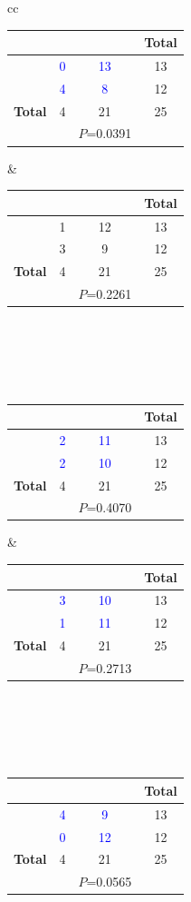 \documentclass[compress, notes=hide]{beamer}
\begin{document}
\begin{frame}
\begin{block}{}
\begin{table}
\begin{footnotesize}
\begin{tabular}{cc}
\begin{tabular}{lccc}
& & & \textbf{Total}
\\
\hline
& \textcolor{blue}{0} &  \textcolor{blue}{13} & 13 \\
&  \textcolor{blue}{4} &  \textcolor{blue}{8} & 12 \\
\textbf{Total} & 4 & 21& 25 \\
\hline
& & $P$=0.0391 &
\end{tabular}
&
\begin{tabular}{lccc}
& & & \textbf{Total}
\\
\hline
& 1 & 12 & 13 \\
& 3 & 9 & 12 \\
\textbf{Total} & 4 & 21& 25 \\
\hline
& & $P$=0.2261 &
\end{tabular}
\\ \\ \\ \\
\begin{tabular}{lccc}
& & & \textbf{Total}
\\
\hline
&  \textcolor{blue}{2} &  \textcolor{blue}{11} & 13 \\
&  \textcolor{blue}{2} &  \textcolor{blue}{10} & 12 \\
\textbf{Total} & 4 & 21& 25 \\
\hline
& & $P$=0.4070 &
\end{tabular}
&
\begin{tabular}{lccc}
& & & \textbf{Total}
\\
\hline
&  \textcolor{blue}{3} &  \textcolor{blue}{10} & 13 \\
&  \textcolor{blue}{1} &  \textcolor{blue}{11} & 12 \\
\textbf{Total} & 4 & 21& 25 \\
\hline
& & $P$=0.2713 &
\end{tabular}
\\ \\ \\ \\
\begin{tabular}{lccc}
& & & \textbf{Total}
\\
\hline
&  \textcolor{blue}{4} &  \textcolor{blue}{9} & 13 \\
&  \textcolor{blue}{0} &  \textcolor{blue}{12} & 12 \\
\textbf{Total} & 4 & 21& 25 \\
\hline
& & $P$=0.0565 &
\end{tabular}
\end{tabular}
\end{footnotesize}
\end{table}
\end{block}
\end{frame}
\end{document}
